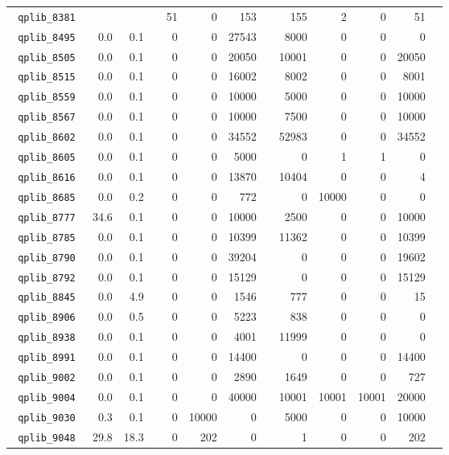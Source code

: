 {\begin{longtable}{lrrrrrrrrrrrr}
\texttt{ 	qplib\_8381	}	&		&		&	&	51	&	0	&	153	&	&	155	&	2	&	0	&	51	\\
\texttt{ 	qplib\_8495	}	&	0.0	&	0.1	&	&	0	&	0	&	27543	&	&	8000	&	0	&	0	&	0	\\
\texttt{ 	qplib\_8505	}	&	0.0	&	0.1	&	&	0	&	0	&	20050	&	&	10001	&	0	&	0	&	20050	\\
\texttt{ 	qplib\_8515	}	&	0.0	&	0.1	&	&	0	&	0	&	16002	&	&	8002	&	0	&	0	&	8001	\\
\texttt{ 	qplib\_8559	}	&	0.0	&	0.1	&	&	0	&	0	&	10000	&	&	5000	&	0	&	0	&	10000	\\
\texttt{ 	qplib\_8567	}	&	0.0	&	0.1	&	&	0	&	0	&	10000	&	&	7500	&	0	&	0	&	10000	\\
\texttt{ 	qplib\_8602	}	&	0.0	&	0.1	&	&	0	&	0	&	34552	&	&	52983	&	0	&	0	&	34552	\\
\texttt{ 	qplib\_8605	}	&	0.0	&	0.1	&	&	0	&	0	&	5000	&	&	0	&	1	&	1	&	0	\\
\texttt{ 	qplib\_8616	}	&	0.0	&	0.1	&	&	0	&	0	&	13870	&	&	10404	&	0	&	0	&	4	\\
\texttt{ 	qplib\_8685	}	&	0.0	&	0.2	&	&	0	&	0	&	772	&	&	0	&	10000	&	0	&	0	\\
\texttt{ 	qplib\_8777	}	&	34.6	&	0.1	&	&	0	&	0	&	10000	&	&	2500	&	0	&	0	&	10000	\\
\texttt{ 	qplib\_8785	}	&	0.0	&	0.1	&	&	0	&	0	&	10399	&	&	11362	&	0	&	0	&	10399	\\
\texttt{ 	qplib\_8790	}	&	0.0	&	0.1	&	&	0	&	0	&	39204	&	&	0	&	0	&	0	&	19602	\\
\texttt{ 	qplib\_8792	}	&	0.0	&	0.1	&	&	0	&	0	&	15129	&	&	0	&	0	&	0	&	15129	\\
\texttt{ 	qplib\_8845	}	&	0.0	&	4.9	&	&	0	&	0	&	1546	&	&	777	&	0	&	0	&	15	\\
\texttt{ 	qplib\_8906	}	&	0.0	&	0.5	&	&	0	&	0	&	5223	&	&	838	&	0	&	0	&	0	\\
\texttt{ 	qplib\_8938	}	&	0.0	&	0.1	&	&	0	&	0	&	4001	&	&	11999	&	0	&	0	&	0	\\
\texttt{ 	qplib\_8991	}	&	0.0	&	0.1	&	&	0	&	0	&	14400	&	&	0	&	0	&	0	&	14400	\\
\texttt{ 	qplib\_9002	}	&	0.0	&	0.1	&	&	0	&	0	&	2890	&	&	1649	&	0	&	0	&	727	\\
\texttt{ 	qplib\_9004	}	&	0.0	&	0.1	&	&	0	&	0	&	40000	&	&	10001	&	10001	&	10001	&	20000	\\
\texttt{ 	qplib\_9030	}	&	0.3	&	0.1	&	&	0	&	10000	&	0	&	&	5000	&	0	&	0	&	10000	\\
\texttt{ 	qplib\_9048	}	&	29.8	&	18.3	&	&	0	&	202	&	0	&	&	1	&	0	&	0	&	202	\\


\bottomrule


\end{longtable}

}




